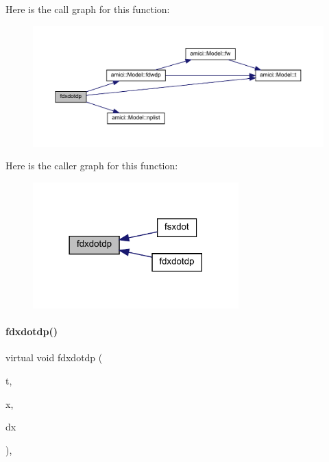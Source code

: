 Here is the call graph for this function\+:
\nopagebreak
\begin{figure}[H]
\begin{center}
\leavevmode
\includegraphics[width=350pt]{classamici_1_1_model___o_d_e_a371aa66b99b1b3b20ed2e533d9b44870_cgraph}
\end{center}
\end{figure}
Here is the caller graph for this function\+:
\nopagebreak
\begin{figure}[H]
\begin{center}
\leavevmode
\includegraphics[width=225pt]{classamici_1_1_model___o_d_e_a371aa66b99b1b3b20ed2e533d9b44870_icgraph}
\end{center}
\end{figure}
\mbox{\label{classamici_1_1_model___o_d_e_afd60580b84c72713288796453f6da33a}} 
\paragraph{\texorpdfstring{fdxdotdp()}{fdxdotdp()}\hspace{0.1cm}{\footnotesize\ttfamily [2/3]}}
{\footnotesize\ttfamily virtual void fdxdotdp (\begin{DoxyParamCaption}\item[{\mbox{\hyperlink{namespaceamici_a1bdce28051d6a53868f7ccbf5f2c14a3}{realtype}}}]{t,  }\item[{\mbox{\hyperlink{classamici_1_1_ami_vector}{Ami\+Vector}} $\ast$}]{x,  }\item[{\mbox{\hyperlink{classamici_1_1_ami_vector}{Ami\+Vector}} $\ast$}]{dx }\end{DoxyParamCaption})\hspace{0.3cm}{\ttfamily [override]}, {\ttfamily [virtual]}}

